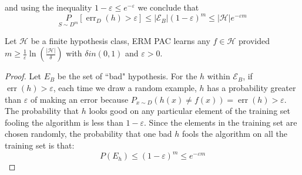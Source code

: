 and using the inequality $1-\varepsilon \leq e^{-\varepsilon}$ we conclude that
$$
\underset{S \sim D^{m}}{P}\left[\operatorname{err}_{D}\left(h\right)>\varepsilon\right] \leq\left|\mathcal{E}_{B}\right|(1-\varepsilon)^{m} \leq|\mathcal{H}| e^{-\varepsilon m}
$$

\begin{corollary}
Let $\mathcal{H}$ be a finite hypothesis class, ERM PAC learns any $f \in \mathcal{H}$ provided $m \geq \frac{1}{\varepsilon}\ln(\frac{|\mathcal{H}|}{\delta})$ with $\delta in (0,1)$ and $\varepsilon >0$. 

\end{corollary}

\begin{proof} 
Let $E_{B}$ be the set of ``bad" hypothesis. For the $h$ within $\mathcal{E}_{B}$, if $\operatorname{err}(h) > \varepsilon$, each time we draw a random example, $h$ has a probability greater than $\varepsilon$ of making an error because $P_{x \sim D}(h(x) \neq f(x)) = \operatorname{err}(h) > \varepsilon$. The probability that $h$ looks good on any particular element of the training set fooling the algorithm is less than $1-\varepsilon$. Since the elements in the training set are chosen randomly, the probability that one bad $h$ fools the algorithm on all the training set is that:
 \begin{equation*}
     P(E_{h}) \leq (1-\varepsilon)^{m} \leq e^{-\varepsilon m}
 \end{equation*}
 
 
 

\end{proof}

